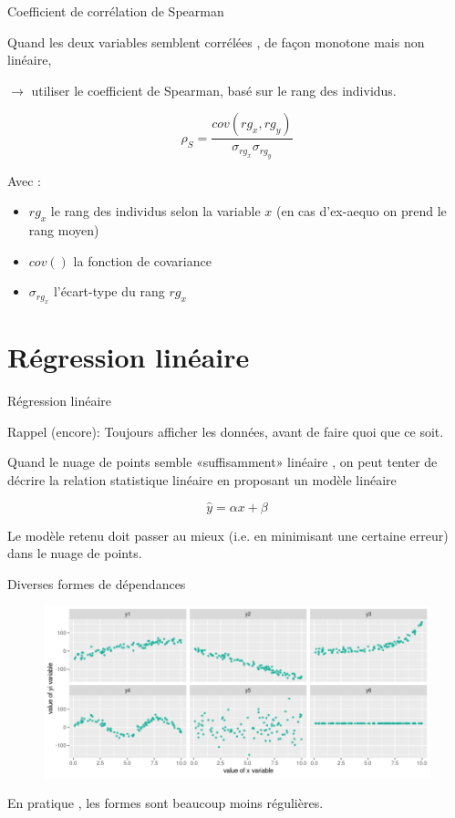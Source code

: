 \documentclass{beamer}
\begin{document}
\begin{frame}{Coefficient de corrélation de Spearman}



Quand les deux variables semblent corrélées , de façon \alert{monotone} mais \alert{non linéaire},

$\rightarrow$ utiliser le coefficient de \alert{Spearman}, basé sur le \alert{rang} des individus.


$$\rho_S= \frac{cov(rg_x, rg_y)}{\sigma_{rg_x}\sigma_{rg_y}}$$


Avec :
\begin{itemize}
  \item $rg_x$ le rang des individus selon la variable $x$  (en cas d'ex-aequo on prend le rang moyen)
  \item $cov()$ la fonction de covariance
  \item $\sigma_{rg_x}$ l'écart-type du rang $rg_x$
\end{itemize}



\end{frame}


\section{Régression linéaire}

\begin{frame}{Régression linéaire}


Rappel (encore): \alert{Toujours} afficher les données, avant de faire quoi que ce soit.


Quand le nuage de points semble «suffisamment» linéaire , on peut tenter de décrire la relation statistique linéaire en proposant un \alert{modèle}  linéaire 

$$\hat{y} = \alpha x + \beta$$



Le modèle retenu doit passer \alert{au mieux} (i.e. en minimisant une certaine erreur) dans le nuage de points.


\end{frame}


\begin{frame}{Diverses formes de dépendances}
\begin{figure}
\includegraphics[width=\linewidth]{img/formes_dependances.png}
\end{figure}

En pratique , les formes sont beaucoup moins régulières.

\end{frame}
\end{document}
